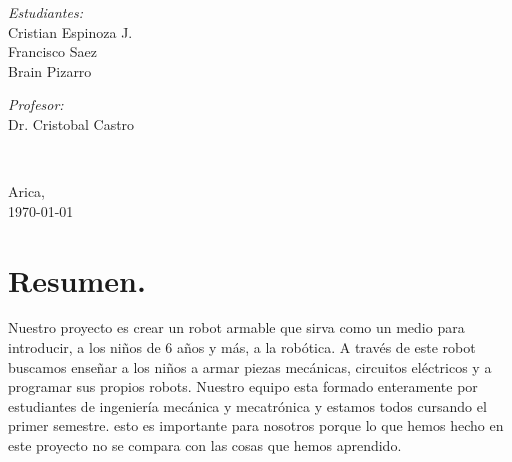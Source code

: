 \documentclass[11pt]{article}
\begin{document}
\begin{center}
\begin{minipage}{0.46\textwidth}
\begin{flushleft}
\emph{Estudiantes:}\\	
Cristian Espinoza J.\\
Francisco Saez\\
Brain Pizarro
\end{flushleft}																		%
\end{minipage}		
\begin{minipage}{0.52\textwidth}		
\vspace{-0.6cm}											%
\begin{flushright} \large															%
\emph{Profesor:} \\																	%
Dr. Cristobal Castro\\														%
\end{flushright}																	%
\end{minipage}	
\vspace*{1cm}
 	
 		\\																		%
\vspace{2cm} 
\end{center}

\begin{center}	
Arica,\\
{\large \today}																	%
\end{center}										  						


\tableofcontents 

\newpage
\section{Resumen.}



Nuestro proyecto es crear un robot armable que sirva como un medio para introducir, a los niños de 6 años y  más, a la robótica. A través de este robot buscamos enseñar a los niños a armar piezas mecánicas, circuitos eléctricos y a programar sus propios robots. Nuestro equipo esta formado enteramente por estudiantes de ingeniería mecánica y mecatrónica y estamos todos cursando el primer semestre. esto es importante para nosotros porque lo que hemos hecho en este proyecto no se compara con las cosas que hemos aprendido.
\end{document}

